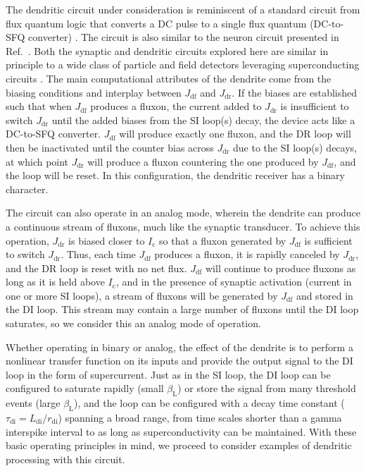 \documentclass[twocolumn]{article}
\newcommand{\onlinecite}[1]{\hspace{-1 ex} \nocite{#1}\citenum{#1}}
\begin{document}
The dendritic circuit under consideration is reminiscent of a standard circuit from flux quantum logic that converts a DC pulse to a single flux quantum (DC-to-SFQ converter) \cite{vatu1998,ka1999}. The circuit is also similar to the neuron circuit presented in Ref.\,\onlinecite{crsc2010}. Both the synaptic and dendritic circuits explored here are similar in principle to a wide class of particle and field detectors leveraging superconducting circuits \cite{vatu1998}. The main computational attributes of the dendrite come from the biasing conditions and interplay between $J_{\mathrm{df}}$ and $J_{\mathrm{dr}}$. If the biases are established such that when $J_{\mathrm{df}}$ produces a fluxon, the current added to $J_{\mathrm{dr}}$ is insufficient to switch $J_{\mathrm{dr}}$ until the added biases from the SI loop(s) decay, the device acts like a DC-to-SFQ converter. $J_{\mathrm{df}}$ will produce exactly one fluxon, and the DR loop will then be inactivated until the counter bias across $J_{\mathrm{dr}}$ due to the SI loop(s) decays, at which point $J_{\mathrm{dr}}$ will produce a fluxon countering the one produced by $J_{\mathrm{df}}$, and the loop will be reset. In this configuration, the dendritic receiver has a binary character.

The circuit can also operate in an analog mode, wherein the dendrite can produce a continuous stream of fluxons, much like the synaptic transducer. To achieve this operation, $J_{\mathrm{dr}}$ is biased closer to $I_{\mathrm{c}}$ so that a fluxon generated by $J_{\mathrm{df}}$ is sufficient to switch $J_{\mathrm{dr}}$. Thus, each time $J_{\mathrm{df}}$ produces a fluxon, it is rapidly canceled by $J_{\mathrm{dr}}$, and the DR loop is reset with no net flux. $J_{\mathrm{df}}$ will continue to produce fluxons as long as it is held above $I_{\mathrm{c}}$, and in the presence of synaptic activation (current in one or more SI loops), a stream of fluxons will be generated by $J_{\mathrm{df}}$ and stored in the DI loop. This stream may contain a large number of fluxons until the DI loop saturates, so we consider this an analog mode of operation.

Whether operating in binary or analog, the effect of the dendrite is to perform a nonlinear transfer function on its inputs and provide the output signal to the DI loop in the form of supercurrent. Just as in the SI loop, the DI loop can be configured to saturate rapidly (small $\beta_{\mathrm{L}}$) or store the signal from many threshold events (large $\beta_{\mathrm{L}}$), and the loop can be configured with a decay time constant ($\tau_{\mathrm{di}} = L_{\mathrm{di}} / r_{\mathrm{di}}$) spanning a broad range, from time scales shorter than a gamma interspike interval to as long as superconductivity can be maintained. With these basic operating principles in mind, we proceed to consider examples of dendritic processing with this circuit.
\end{document}
